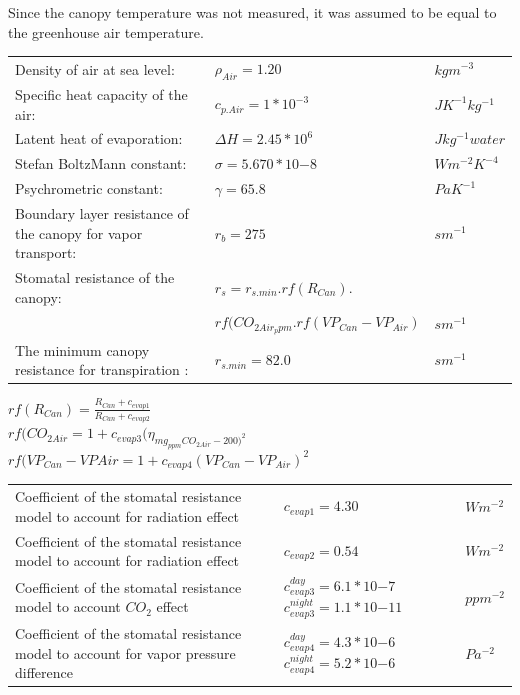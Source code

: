 \indent Since the canopy temperature was not measured, it was assumed to be equal to the greenhouse air temperature.\\
\begin{center}
\begin{tabular}{m{7cm}m{5.5cm}m{2.5cm}}
 Density of air at sea level: & $\rho_{Air}=1.20$ & $kg m^{-3}$ \\ 
 Specific heat capacity of the air: & $c_{p.Air}=1*10^{-3}$ & $JK^{-1}kg^{-1}$ \\  
 Latent heat of evaporation: & $\Delta H=2.45*10^{6}$ & $Jkg^{-1}water$\\    
 Stefan BoltzMann constant: & $\sigma=5.670*10{-8}$ & $Wm^{-2}K^{-4}$\\    
 Psychrometric constant: & $\gamma=65.8$ & $PaK^{-1}$\\    
 Boundary layer resistance of the canopy for vapor transport: & $r_{b}=275$ & $sm^{-1}$\\
 Stomatal resistance of the canopy: & $r_{s}=r_{s.min}.rf(R_{Can}).$ & \\
  & $rf(CO_{2Air_ppm}.rf(VP_{Can}-VP_{Air})$ &$sm^{-1}$\\
 The minimum canopy resistance for transpiration : & $r_{s.min}=82.0$ & $sm^{-1}$\\  
\end{tabular}
\end{center}
 \indent \indent \indent \indent \indent \indent \indent \indent$rf(R_{Can})=\frac{R_{Can}+c_{evap1}}{R_{Can}+c_{evap2}}$ \\
 \indent \indent \indent \indent \indent \indent \indent$rf(CO_{2Air}=1+c_{evap3}(\eta_{mg_{ppm}CO_{2Air}-200)^{2}}$ \\
 \indent \indent \indent \indent \indent \indent \indent$rf(VP_{Can}-VP{Air}=1+c_{evap4}(VP_{Can}-VP_{Air})^{2}$ \\
\begin{center}
\begin{tabular}{m{7.5cm}m{3cm}m{2.5cm}}
Coefficient of the stomatal resistance model to account for radiation effect&$c_{evap1}=4.30$& $Wm^{-2}$\\
Coefficient of the stomatal resistance model to account for radiation effect&$c_{evap2}=0.54$& $Wm^{-2}$\\
Coefficient of the stomatal resistance model to account $CO_{2}$ effect&$c_{evap3}^{day}=6.1*10{-7}$   $c_{evap3}^{night}=1.1*10{-11}$& $ppm^{-2}$\\
Coefficient of the stomatal resistance model to account for vapor pressure difference&$c_{evap4}^{day}=4.3*10{-6}$ $c_{evap4}^{night}=5.2*10{-6}$& $Pa^{-2}$\\

\end{tabular}
\end{center}
